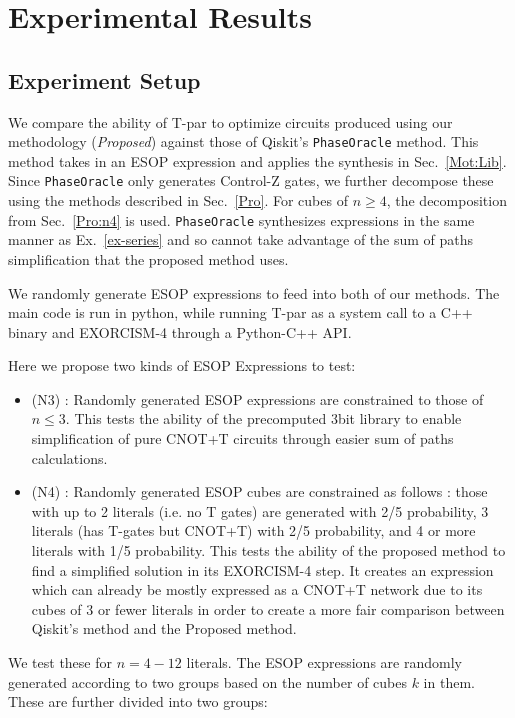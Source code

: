 \section{Experimental Results}
\label{Exp}
\subsection{Experiment Setup}
\label{Exp:Set}
We compare the ability of T-par to optimize circuits produced using our methodology ({\it Proposed}) against those
of Qiskit's \texttt{PhaseOracle} method. This method takes in an ESOP expression and applies the synthesis in
Sec.~\ref{Mot:Lib}. Since \texttt{PhaseOracle} only generates Control-Z gates,
we further decompose these using the methods described in Sec.~\ref{Pro}.  For cubes of $n \geq 4$,
the decomposition from Sec.~\ref{Pro:n4} is used. \texttt{PhaseOracle} synthesizes expressions in the same
manner as Ex.~\ref{ex-series} and so cannot take advantage of the sum of paths simplification that
the proposed method uses.

We randomly generate ESOP expressions to feed into both of our methods. The main code is run in python,
while running T-par as a system call to a C++ binary and EXORCISM-4 through a Python-C++ API.

Here we propose two kinds of ESOP Expressions to test:

\begin{itemize}
\item (N3) : Randomly generated ESOP expressions are constrained to those of $n \leq 3$. This tests the
  ability of the precomputed 3bit library to enable simplification of pure CNOT+T circuits through easier
  sum of paths calculations.
\item (N4) : Randomly generated ESOP cubes are constrained as follows :
  those with up to 2 literals (i.e. no T gates)  are generated with 2/5 probability,
  3 literals (has T-gates but CNOT+T) with 2/5 probability, and 4 or more literals with 1/5 probability.
  This tests the ability of the proposed method to find a simplified solution in its EXORCISM-4 step.
  It creates an expression which can already be mostly expressed as a CNOT+T network due to its cubes of
  3 or fewer literals in order to create a more fair comparison between Qiskit's method and the Proposed
  method.
\end{itemize}

We test these for $n=4-12$ literals. The ESOP expressions are randomly generated according to two groups
based on the number of cubes $k$ in them. These are further divided into two groups:

